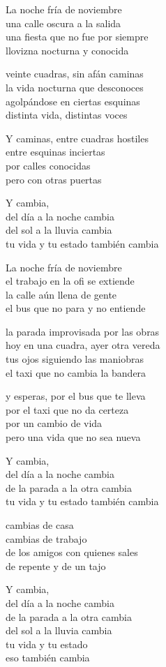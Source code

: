\begin{lyrics}
La noche fría de noviembre\\
una calle oscura a la salida\\
una fiesta que no fue por siempre\\
llovizna nocturna y conocida

veinte cuadras, sin afán caminas\\
la vida nocturna que desconoces\\
agolpándose en ciertas esquinas\\
distinta vida, distintas voces

Y caminas, entre cuadras hostiles\\
entre esquinas inciertas\\
por calles conocidas\\
pero con otras puertas

Y cambia,\\
del día a la noche cambia\\
del sol a la lluvia cambia\\
tu vida y tu estado también cambia

La noche fría de noviembre\\
el trabajo en la ofi se extiende\\
la calle aún llena de gente\\
el bus que no para y no entiende

la parada improvisada por las obras\\
hoy en una cuadra, ayer otra vereda\\
tus ojos siguiendo las maniobras\\
el taxi que no cambia la bandera

y esperas, por el bus que te lleva\\
por el taxi que no da certeza\\
por un cambio de vida\\
pero una vida que no sea nueva

Y cambia,\\
del día a la noche cambia\\
de la parada a la otra cambia\\
tu vida y tu estado también cambia

cambias de casa\\
cambias de trabajo\\
de los amigos con quienes sales\\
de repente y de un tajo

Y cambia,\\
del día a la noche cambia\\
de la parada a la otra cambia\\
del sol a la lluvia cambia\\
tu vida y tu estado\\
eso también cambia
\end{lyrics}

